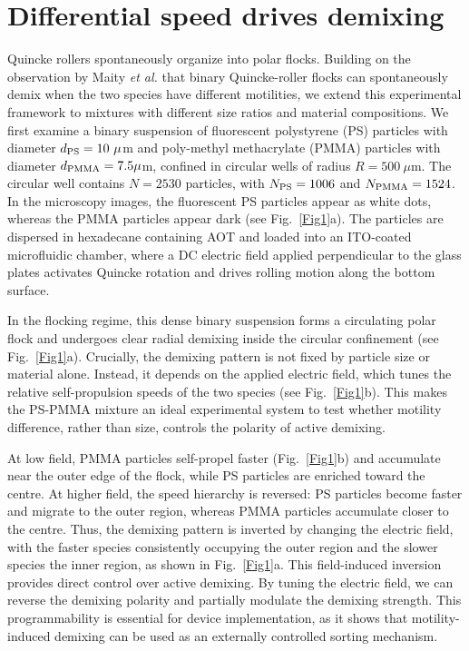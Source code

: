\documentclass[aps,pre,twocolumn,amsmath,amssymb,notitlepage,superscriptaddress,longbibliography,nofootinbib,10pt]{revtex4-1}
\begin{document}
\section{Differential speed drives demixing}
\label{sec:demixing}
Quincke rollers spontaneously organize into polar flocks. Building on the observation by Maity \textit{et al.} that binary Quincke-roller flocks can spontaneously demix when the two species have different motilities, we extend this experimental framework to mixtures with different size ratios and material compositions.
We first examine a binary suspension of fluorescent polystyrene (PS) particles with diameter 
$d_{\rm PS}=10~\mu$m and poly-methyl methacrylate (PMMA) particles with diameter 
$d_{\rm PMMA}=7.5\mu$m, confined in circular wells of radius 
$R=500~\mu$m. The circular well contains $N=2530$ particles, with 
$N_{\rm PS}=1006$ and $N_{\rm PMMA}=1524$. In the microscopy images, the fluorescent PS particles appear as white dots, whereas the PMMA particles appear dark (see Fig.~\ref{Fig1}a). The particles are dispersed in hexadecane containing AOT and loaded into an ITO-coated microfluidic chamber, where a DC electric field applied perpendicular to the glass plates activates Quincke rotation and drives rolling motion along the bottom surface.


In the flocking regime, this dense binary suspension forms a circulating polar flock and undergoes clear radial demixing inside the circular confinement (see Fig.~\ref{Fig1}a). Crucially, the demixing pattern is not fixed by particle size or material alone. Instead, it depends on the applied electric field, which tunes the relative self-propulsion speeds of the two species (see Fig.~\ref{Fig1}b). This makes the PS-PMMA mixture an ideal experimental system to test whether motility difference, rather than size, controls the polarity of active demixing.  

At low field, PMMA particles self-propel faster (Fig.~\ref{Fig1}b) and accumulate near the outer edge of the flock, while PS particles are enriched toward the centre. At higher field, the speed hierarchy is reversed: PS particles become faster and migrate to the outer region, whereas PMMA particles accumulate closer to the centre. Thus, the demixing pattern is inverted by changing the electric field, with the faster species consistently occupying the outer region and the slower species the inner region, as shown in Fig.~\ref{Fig1}a. This field-induced inversion provides direct control over active demixing. By tuning the electric field, we can reverse the demixing polarity and partially modulate the demixing strength. This programmability is essential for device implementation, as it shows that motility-induced demixing can be used as an externally controlled sorting mechanism. 
\end{document}

